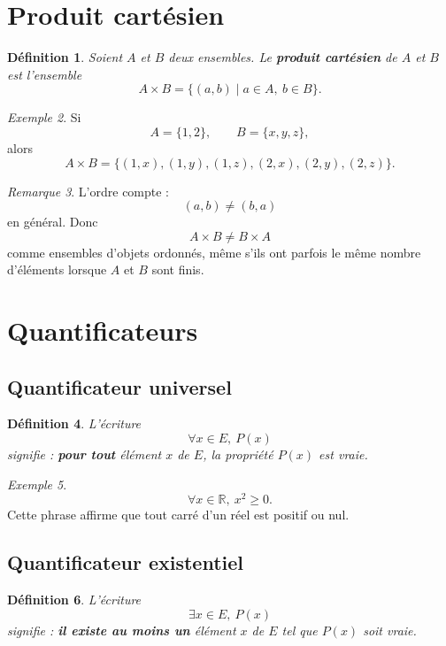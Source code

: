 \documentclass[11pt,a4paper]{article}
\newtheorem{definition}{Définition}[section]
\theoremstyle{remark}
\newtheorem{remarque}[definition]{Remarque}
\newtheorem{exemple}[definition]{Exemple}
\newcommand{\R}{\mathbb{R}}
\begin{document}
\section{Produit cartésien}

\begin{definition}
Soient \(A\) et \(B\) deux ensembles. Le \textbf{produit cartésien} de \(A\) et \(B\) est l’ensemble
\[
A\times B=\{(a,b)\mid a\in A,\ b\in B\}.
\]
\end{definition}

\begin{exemple}
Si
\[
A=\{1,2\},
\qquad
B=\{x,y,z\},
\]
alors
\[
A\times B=\{(1,x),(1,y),(1,z),(2,x),(2,y),(2,z)\}.
\]
\end{exemple}

\begin{remarque}
L’ordre compte :
\[
(a,b)\neq (b,a)
\]
en général. Donc
\[
A\times B \neq B\times A
\]
comme ensembles d’objets ordonnés, même s’ils ont parfois le même nombre d’éléments lorsque \(A\) et \(B\) sont finis.
\end{remarque}

\section{Quantificateurs}

\subsection{Quantificateur universel}

\begin{definition}
L’écriture
\[
\forall x\in E,\ P(x)
\]
signifie : \textbf{pour tout} élément \(x\) de \(E\), la propriété \(P(x)\) est vraie.
\end{definition}

\begin{exemple}
\[
\forall x\in \R,\ x^2\geq 0.
\]
Cette phrase affirme que tout carré d’un réel est positif ou nul.
\end{exemple}

\subsection{Quantificateur existentiel}

\begin{definition}
L’écriture
\[
\exists x\in E,\ P(x)
\]
signifie : \textbf{il existe au moins un} élément \(x\) de \(E\) tel que \(P(x)\) soit vraie.
\end{definition}
\end{document}
